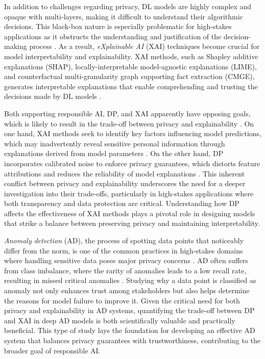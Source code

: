 In addition to challenges regarding privacy, DL models are highly complex and opaque with multi-layers, making it difficult to understand their algorithmic decisions. This black-box nature is especially problematic for high-stakes applications as it obstructs the understanding and justification of the decision-making process \citep{noor2024survey}. As a result, \textit{eXplainable AI} (XAI) techniques become crucial for model interpretability and explainability. XAI methods, such as Shapley additive explanations (SHAP), locally-interpretable model-agnostic explanations (LIME), and counterfactual
multi-granularity graph supporting fact extraction (CMGE), generates interpretable explanations that enable comprehending and trusting the decisions made by DL models \citep{yang2023survey}. 

Both supporting responsible AI, DP, and XAI apparently have opposing goals, which is likely to result in the trade-off between privacy and explainability \citep{ezzeddine2024differential}. On one hand, XAI methods seek to identify key factors influencing model predictions, which may inadvertently reveal sensitive personal information through explanations derived from model parameters \citep{patel2022model}. On the other hand, DP incorporates calibrated noise to enforce privacy guarantees, which distorts feature attributions and reduces the reliability of model explanations \citep{bozorgpanah2022privacy}. This inherent conflict between privacy and explainability underscores the need for a deeper investigation into their trade-offs, particularly in high-stakes applications where both transparency and data protection are critical. Understanding how DP affects the effectiveness of XAI methods plays a pivotal role in designing models that strike a balance between preserving privacy and maintaining interpretability.

\textit{Anomaly detection} (AD), the process of spotting data points that noticeably differ from the norm, is one of the common practices in high-stakes domains where handling sensitive data poses major privacy concerns \cite{fan2013differentially}. AD often suffers from class imbalance, where the rarity of anomalies leads to a low recall rate, resulting in missed critical anomalies \citep{pang2021deep}. Studying why a data point is classified as anomaly not only enhances trust among stakeholders but also helps determine the reasons for model failure to improve it. Given the critical need for both privacy and explainability in AD systems, quantifying the trade-off between DP and XAI in deep AD models is both scientifically valuable and practically beneficial. This type of study lays the foundation for developing an effective AD system that balances privacy guarantees with trustworthiness, contributing to the broader goal of responsible AI.

